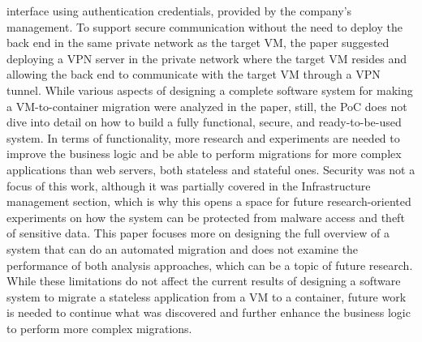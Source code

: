 \documentclass[twocolumn]{article}
\begin{document}
interface using authentication credentials, provided by the company's management. To support secure communication without the need to deploy the back end in the same private network as the target VM, the paper suggested deploying a VPN server in the private network where the target VM resides and allowing the back end to communicate with the target VM through a VPN tunnel. While various aspects of designing a complete software system for making a VM-to-container migration were analyzed in the paper, still, the PoC does not dive into detail on how to build a fully functional, secure, and ready-to-be-used system. In terms of functionality, more research and experiments are needed to improve the business logic and be able to perform migrations for more complex applications than web servers, both stateless and stateful ones. Security was not a focus of this work, although it was partially covered in the Infrastructure management section, which is why this opens a space for future research-oriented experiments on how the system can be protected from malware access and theft of sensitive data. This paper focuses more on designing the full overview of a system that can do an automated migration and does not examine the performance of both analysis approaches, which can be a topic of future research. While these limitations do not affect the current results of designing a software system to migrate a stateless application from a VM to a container, future work is needed to continue what was discovered and further enhance the business logic to perform more complex migrations.
\end{document}
